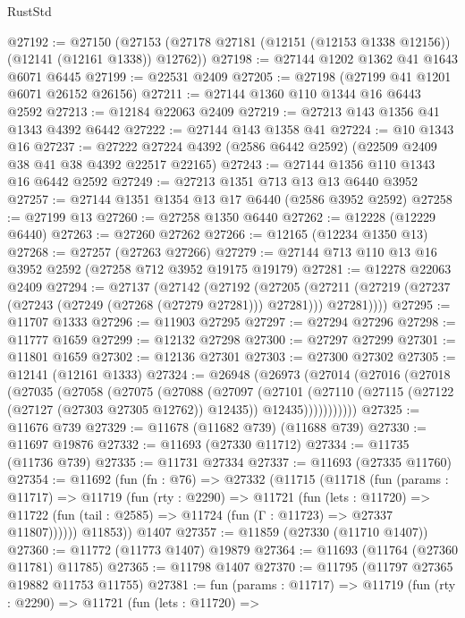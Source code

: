 \begin{lexlean}{RustStd}
\begin{coremodule}
@27192 := @27150
    (@27153 (@27178 @27181 (@12151 (@12153 @1338 @12156)) (@12141 (@12161 @1338)) @12762))
@27198 := @27144 @1202 @1362 @41 @1643 @6071 @6445
@27199 := @22531 @2409
@27205 := @27198 (@27199 @41 @1201 @6071 @26152 @26156)
@27211 := @27144 @1360 @110 @1344 @16 @6443 @2592
@27213 := @12184 @22063 @2409
@27219 := @27213 @143 @1356 @41 @1343 @4392 @6442
@27222 := @27144 @143 @1358 @41
@27224 := @10 @1343 @16
@27237 := @27222 @27224 @4392 (@2586 @6442 @2592) (@22509 @2409 @38 @41 @38 @4392 @22517 @22165)
@27243 := @27144 @1356 @110 @1343 @16 @6442 @2592
@27249 := @27213 @1351 @713 @13 @13 @6440 @3952
@27257 := @27144 @1351 @1354 @13 @17 @6440 (@2586 @3952 @2592)
@27258 := @27199 @13
@27260 := @27258 @1350 @6440
@27262 := @12228 (@12229 @6440)
@27263 := @27260 @27262
@27266 := @12165 (@12234 @1350 @13)
@27268 := @27257 (@27263 @27266)
@27279 := @27144 @713 @110 @13 @16 @3952 @2592 (@27258 @712 @3952 @19175 @19179)
@27281 := @12278 @22063 @2409
@27294 := @27137
    (@27142
      (@27192
        (@27205
          (@27211 (@27219 (@27237 (@27243 (@27249 (@27268 (@27279 @27281))) @27281))) @27281))))
@27295 := @11707 @1333
@27296 := @11903 @27295
@27297 := @27294 @27296
@27298 := @11777 @1659
@27299 := @12132 @27298
@27300 := @27297 @27299
@27301 := @11801 @1659
@27302 := @12136 @27301
@27303 := @27300 @27302
@27305 := @12141 (@12161 @1333)
@27324 := @26948
    (@26973
      (@27014
        (@27016
          (@27018
            (@27035
              (@27058
                (@27075
                  (@27088
                    (@27097
                      (@27101
                        (@27110
                          (@27115 (@27122 (@27127 (@27303 @27305 @12762)) @12435))
                          @12435)))))))))))
@27325 := @11676 @739
@27329 := @11678 (@11682 @739) (@11688 @739)
@27330 := @11697 @19876
@27332 := @11693 (@27330 @11712)
@27334 := @11735 (@11736 @739)
@27335 := @11731 @27334
@27337 := @11693 (@27335 @11760)
@27354 := @11692
    (fun (fn : @76) =>
    @27332
      (@11715
        (@11718
          (fun (params : @11717) =>
          @11719
            (fun (rty : @2290) =>
            @11721
              (fun (lets : @11720) =>
              @11722 (fun (tail : @2585) => @11724 (fun (Γ : @11723) => @27337 @11807))))))
        @11853))
    @1407
@27357 := @11859 (@27330 (@11710 @1407))
@27360 := @11772 (@11773 @1407) @19879
@27364 := @11693 (@11764 (@27360 @11781) @11785)
@27365 := @11798 @1407
@27370 := @11795 (@11797 @27365 @19882 @11753 @11755)
@27381 := fun (params : @11717) =>
  @11719
    (fun (rty : @2290) =>
    @11721
      (fun (lets : @11720) =>

\end{coremodule}
\end{lexlean}
